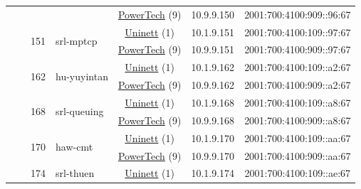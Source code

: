\begin{small}
\begin{center}
\begin{longtable}{|c|c|c|c|c|c|c|c|}
  &  &  &  & \multicolumn{2}{|c|}{\tiny{\href{http://www.powertech.no}{PowerTech} (9)}} & \tiny{10.9.9.150} & \tiny{2001:700:4100:909::96:67} \\* \cline{3-3}\cline{4-4}\cline{5-5}\cline{6-6}\cline{7-7}\cline{8-8}
  &  & \multirow{2}{*}{\tiny{151}} & \multicolumn{1}{|l|}{\multirow{2}{*}{\tiny{srl-mptcp}}} & \multicolumn{2}{|c|}{\tiny{\href{https://www.uninett.no}{Uninett} (1)}} & \tiny{10.1.9.151} & \tiny{2001:700:4100:109::97:67} \\* \cline{5-5}\cline{6-6}\cline{7-7}\cline{8-8}
  &  &  &  & \multicolumn{2}{|c|}{\tiny{\href{http://www.powertech.no}{PowerTech} (9)}} & \tiny{10.9.9.151} & \tiny{2001:700:4100:909::97:67} \\* \cline{3-3}\cline{4-4}\cline{5-5}\cline{6-6}\cline{7-7}\cline{8-8}
  &  & \multirow{2}{*}{\tiny{162}} & \multicolumn{1}{|l|}{\multirow{2}{*}{\tiny{hu-yuyintan}}} & \multicolumn{2}{|c|}{\tiny{\href{https://www.uninett.no}{Uninett} (1)}} & \tiny{10.1.9.162} & \tiny{2001:700:4100:109::a2:67} \\* \cline{5-5}\cline{6-6}\cline{7-7}\cline{8-8}
  &  &  &  & \multicolumn{2}{|c|}{\tiny{\href{http://www.powertech.no}{PowerTech} (9)}} & \tiny{10.9.9.162} & \tiny{2001:700:4100:909::a2:67} \\* \cline{3-3}\cline{4-4}\cline{5-5}\cline{6-6}\cline{7-7}\cline{8-8}
  &  & \multirow{2}{*}{\tiny{168}} & \multicolumn{1}{|l|}{\multirow{2}{*}{\tiny{srl-queuing}}} & \multicolumn{2}{|c|}{\tiny{\href{https://www.uninett.no}{Uninett} (1)}} & \tiny{10.1.9.168} & \tiny{2001:700:4100:109::a8:67} \\* \cline{5-5}\cline{6-6}\cline{7-7}\cline{8-8}
  &  &  &  & \multicolumn{2}{|c|}{\tiny{\href{http://www.powertech.no}{PowerTech} (9)}} & \tiny{10.9.9.168} & \tiny{2001:700:4100:909::a8:67} \\* \cline{3-3}\cline{4-4}\cline{5-5}\cline{6-6}\cline{7-7}\cline{8-8}
  &  & \multirow{2}{*}{\tiny{170}} & \multicolumn{1}{|l|}{\multirow{2}{*}{\tiny{haw-cmt}}} & \multicolumn{2}{|c|}{\tiny{\href{https://www.uninett.no}{Uninett} (1)}} & \tiny{10.1.9.170} & \tiny{2001:700:4100:109::aa:67} \\* \cline{5-5}\cline{6-6}\cline{7-7}\cline{8-8}
  &  &  &  & \multicolumn{2}{|c|}{\tiny{\href{http://www.powertech.no}{PowerTech} (9)}} & \tiny{10.9.9.170} & \tiny{2001:700:4100:909::aa:67} \\* \cline{3-3}\cline{4-4}\cline{5-5}\cline{6-6}\cline{7-7}\cline{8-8}
  &  & \multirow{2}{*}{\tiny{174}} & \multicolumn{1}{|l|}{\multirow{2}{*}{\tiny{srl-thuen}}} & \multicolumn{2}{|c|}{\tiny{\href{https://www.uninett.no}{Uninett} (1)}} & \tiny{10.1.9.174} & \tiny{2001:700:4100:109::ae:67} \\* \cline{5-5}\cline{6-6}\cline{7-7}\cline{8-8}

\end{longtable}
\end{center}
\end{small}
